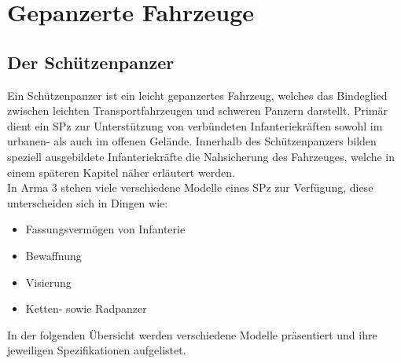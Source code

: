 \chapter{Gepanzerte Fahrzeuge}
\section{Der Schützenpanzer}
	Ein Schützenpanzer ist ein leicht gepanzertes Fahrzeug, welches das Bindeglied zwischen leichten Transportfahrzeugen und schweren Panzern darstellt. Primär dient ein SPz zur Unterstützung von verbündeten Infanteriekräften sowohl im urbanen- als auch im offenen Gelände. Innerhalb des Schützenpanzers bilden speziell ausgebildete Infanteriekräfte die Nahsicherung des Fahrzeuges, welche in einem späteren Kapitel näher erläutert werden.\\
	
	In Arma 3 stehen viele verschiedene Modelle eines SPz zur Verfügung, diese unterscheiden sich in Dingen wie:
	\begin{itemize}
		\item Fassungsvermögen von Infanterie
		\item Bewaffnung
		\item Visierung
		\item Ketten- sowie Radpanzer
	\end{itemize}
	
	In der folgenden Übersicht werden verschiedene Modelle präsentiert und ihre jeweiligen Spezifikationen aufgelistet.


